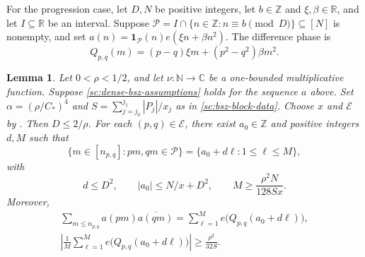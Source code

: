 \documentclass[twoside]{aomart}
\theoremstyle{paperplain}
\newtheorem{lemma}[theorem]{Lemma}
\theoremstyle{paperdefinition}
\numberwithin{equation}{section}
\begin{document}
For the progression case, let $D,N$ be positive integers, let
$b\in\mathbb Z$ and $\xi,\beta\in\mathbb R$, and let
$I\subseteq\mathbb R$ be an interval. Suppose
$\mathcal P=I\cap\{n\in\mathbb Z:n\equiv b\pmod D\}\subseteq[N]$
is nonempty, and set
$a(n)=\mathbf1_{\mathcal P}(n)e(\xi n+\beta n^2)$.
The difference phase is
\begin{equation*}
 Q_{p,q}(m)=(p-q)\xi m+(p^2-q^2)\beta m^2.
\end{equation*}

\begin{samepage}
\begin{lemma}\label{sc:cross-progression}
Let $0<\rho<1/2$, and let $\nu:\mathbb N\to\mathbb C$ be
a one-bounded multiplicative function. Suppose
\eqref{sc:dense-bsz-assumptions} holds for the sequence $a$ above.
Set $\alpha=(\rho/C_*)^4$ and
$\displaystyle S=\sum_{j=j_0}^{j_1}|P_j|/x_j$ as in
\eqref{sc:bsz-block-data}. Choose $x$ and $\mathcal E$ by
. Then $D\le2/\rho$.
For each $(p,q)\in\mathcal E$, there exist $a_0\in\mathbb Z$
and positive integers $d,M$ such that
\begin{equation}
 \{m\in[n_{p,q}]:pm,qm\in\mathcal P\}
 =\{a_0+d\ell:1\le\ell\le M\},
 \label{sc:dense-bsz-cross-AP}
\end{equation}
with
\begin{equation*}
 d\le D^2,\qquad |a_0|\le N/x+D^2,\qquad
 M\ge\frac{\rho^2N}{128Sx}.
\end{equation*}
Moreover,
\begin{equation}
 \begin{gathered}
 \sum_{m\le n_{p,q}}a(pm)\overline{a(qm)}
 =\sum_{\ell=1}^{M}e\bigl(Q_{p,q}(a_0+d\ell)\bigr),\\
 \left|\frac1M\sum_{\ell=1}^{M}e\bigl(Q_{p,q}(a_0+d\ell)\bigr)\right|
 \ge\frac{\rho^2}{32S}.
 \end{gathered}
 \label{sc:dense-bsz-cross-average}
\end{equation}
\end{lemma}
\end{samepage}
\end{document}
